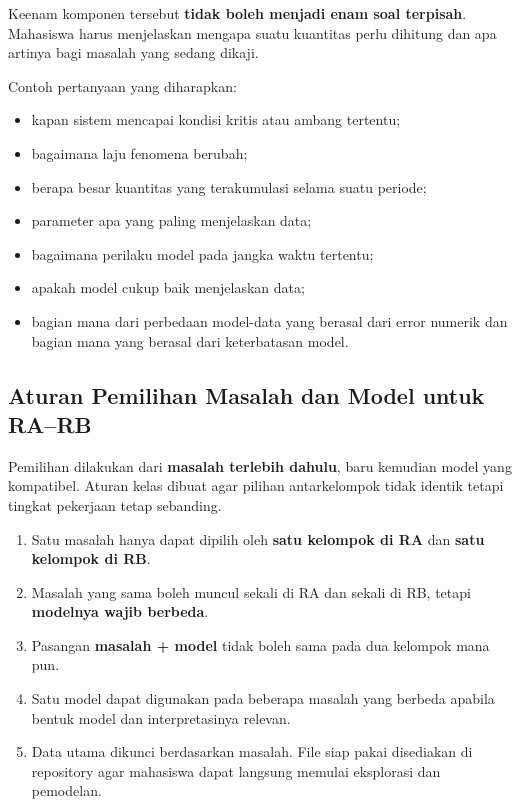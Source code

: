 \documentclass[11pt,a4paper]{article}
\begin{document}
Keenam komponen tersebut \textbf{tidak boleh menjadi enam soal terpisah}. Mahasiswa harus menjelaskan mengapa suatu kuantitas perlu dihitung dan apa artinya bagi masalah yang sedang dikaji.

Contoh pertanyaan yang diharapkan:
\begin{itemize}
    \item kapan sistem mencapai kondisi kritis atau ambang tertentu;
    \item bagaimana laju fenomena berubah;
    \item berapa besar kuantitas yang terakumulasi selama suatu periode;
    \item parameter apa yang paling menjelaskan data;
    \item bagaimana perilaku model pada jangka waktu tertentu;
    \item apakah model cukup baik menjelaskan data;
    \item bagian mana dari perbedaan model-data yang berasal dari error numerik dan bagian mana yang berasal dari keterbatasan model.
\end{itemize}

\subsection*{Aturan Pemilihan Masalah dan Model untuk RA--RB}

Pemilihan dilakukan dari \textbf{masalah terlebih dahulu}, baru kemudian model yang kompatibel. Aturan kelas dibuat agar pilihan antarkelompok tidak identik tetapi tingkat pekerjaan tetap sebanding.

\begin{mdframed}
\begin{enumerate}
    \item Satu masalah hanya dapat dipilih oleh \textbf{satu kelompok di RA} dan \textbf{satu kelompok di RB}.
    \item Masalah yang sama boleh muncul sekali di RA dan sekali di RB, tetapi \textbf{modelnya wajib berbeda}.
    \item Pasangan \textbf{masalah + model} tidak boleh sama pada dua kelompok mana pun.
    \item Satu model dapat digunakan pada beberapa masalah yang berbeda apabila bentuk model dan interpretasinya relevan.
    \item Data utama dikunci berdasarkan masalah. File siap pakai disediakan di repository agar mahasiswa dapat langsung memulai eksplorasi dan pemodelan.
\end{enumerate}
\end{mdframed}
\end{document}
